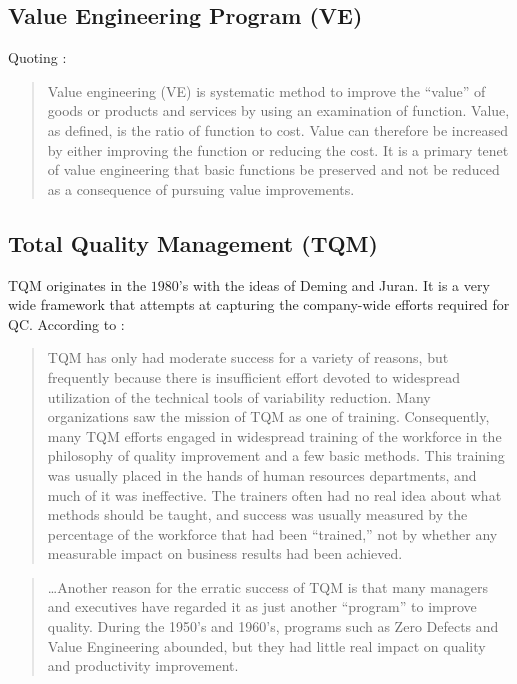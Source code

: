 \subsection{Value Engineering Program (VE)}
Quoting \cite{wikipedia_value_2015}:
\begin{quote}
Value engineering (VE) is systematic method to improve the ``value'' of goods or products and services by using an examination of function. Value, as defined, is the ratio of function to cost. Value can therefore be increased by either improving the function or reducing the cost. It is a primary tenet of value engineering that basic functions be preserved and not be reduced as a consequence of pursuing value improvements.

\end{quote}

\subsection{Total Quality Management (TQM)}
TQM originates in the $1980$'s with the ideas of Deming and Juran.
It is a very wide framework that attempts at capturing the company-wide efforts required for QC. 
According to \citet[p.23]{montgomery_introduction_2007}:
\begin{quote}
TQM has only had moderate success for a variety of reasons, but frequently because there is insufficient effort devoted to widespread utilization of the technical tools of variability reduction. Many organizations saw the mission of TQM as one of training. Consequently, many TQM efforts engaged in widespread training of the workforce in the philosophy of quality improvement and a few basic methods.
This training was usually placed in the hands of human resources departments, and much of it was ineffective. The trainers often had no real idea about what methods should be taught, and success was usually measured by the percentage of the workforce that had been ``trained,'' not by whether any measurable impact on business results had been achieved.
\end{quote}

\begin{quote}
\dots Another reason for the erratic success of TQM is that many managers and executives
have regarded it as just another “program” to improve quality. During the 1950's and 1960's, programs such as Zero Defects and Value Engineering abounded, but they had little real impact on quality and productivity improvement.
\end{quote}



